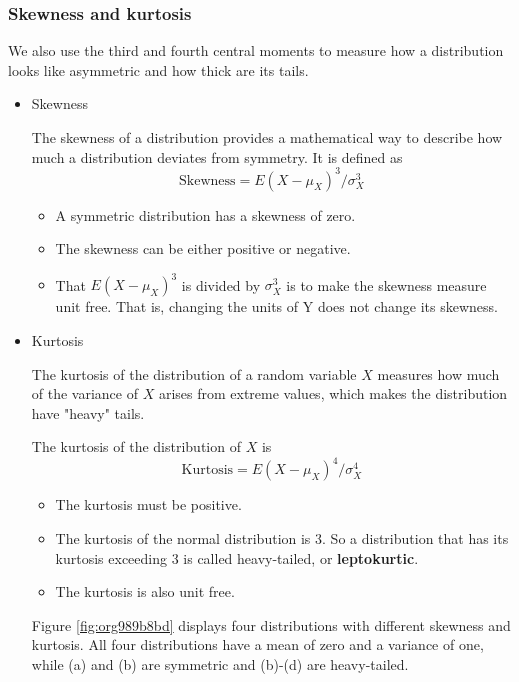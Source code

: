 \documentclass[a4paper,11pt]{article}
\begin{document}
\subsubsection*{Skewness and kurtosis}
\label{sec:org14413fc}

We also use the third and fourth central moments to measure how a
distribution looks like asymmetric and how thick are its tails. 

\begin{itemize}
\item Skewness
\label{sec:orgd48f86f}

The skewness of a distribution provides a mathematical way to describe
how much a distribution deviates from symmetry. It is defined as 
\[ \text{Skewness} =  E(X - \mu_X)^{3}/\sigma_{X}^{3} \]

\begin{itemize}
\item A symmetric distribution has a skewness of zero.
\item The skewness can be either positive or negative.
\item That \(E(X - \mu_X)^3\) is divided by \(\sigma^3_X\) is to make the
skewness measure unit free. That is, changing the units of Y does
not change its skewness.
\end{itemize}

\item Kurtosis
\label{sec:orgb396f5f}

The kurtosis of the distribution of a random variable \(X\) measures how
much of the variance of \(X\) arises from extreme values, which makes
the distribution have "heavy" tails. 

The kurtosis of the distribution of \(X\) is 
\[ \text{Kurtosis} = E(X - \mu_X)^{4}/\sigma_{X}^{4} \]

\begin{itemize}
\item The kurtosis must be positive.
\item The kurtosis of the normal distribution is 3. So a distribution that
has its kurtosis exceeding 3 is called heavy-tailed, or
\textbf{leptokurtic}.
\item The kurtosis is also unit free.
\end{itemize}

Figure \ref{fig:org989b8bd} displays four distributions with different
skewness and kurtosis. All four distributions have a mean of zero and
a variance of one, while (a) and (b) are symmetric and (b)-(d) are
heavy-tailed. 


\end{itemize}
\end{document}
